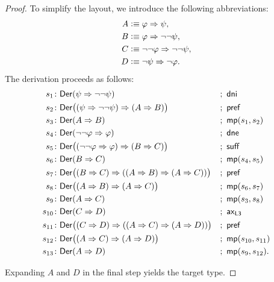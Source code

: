 \begin{proof}
    To simplify the layout, we introduce the following abbreviations:
    \begin{align*}
        A&\mathrel{\vcentcolon}\equiv\varphi\mathrel{\Rightarrow}\psi,\\
        B&\mathrel{\vcentcolon}\equiv\varphi\mathrel{\Rightarrow}\neg\neg\psi,\\
        C&\mathrel{\vcentcolon}\equiv\neg\neg\varphi\mathrel{\Rightarrow}\neg\neg\psi,\\
        D&\mathrel{\vcentcolon}\equiv\neg\psi\mathrel{\Rightarrow}\neg\varphi.
    \end{align*}
    The derivation proceeds as follows:
    {\small
    \begin{align*}
        s_1&\colon\fun{Der}(
            \psi\imp\neg\neg\psi
        )
            &&;\ \fun{dni}\\
        s_2&\colon\fun{Der}\bigl(
            (\psi\imp\neg\neg\psi)
            \imp
            (A\imp B)
        \bigr)
            &&;\ \fun{pref}\\
        s_3&\colon\fun{Der}(
            A\imp B
        )
            &&;\ \fun{mp}(s_1,s_2)\\
        s_4&\colon\fun{Der}(
            \neg\neg\varphi\imp\varphi
        )
            &&;\ \fun{dne}\\
        s_5&\colon\fun{Der}\bigl(
            (\neg\neg\varphi\imp\varphi)
            \imp
            (B\imp C)
        \bigr)
            &&;\ \fun{suff}\\
        s_6&\colon\fun{Der}(
            B\imp C
        )
            &&;\ \fun{mp}(s_4,s_5)\\
        s_7&\colon\fun{Der}\bigl(
            (B\imp C)
            \imp(
                (A\imp B)\imp(A\imp C)
            )
        \bigr)
            &&;\ \fun{pref}\\
        s_8&\colon\fun{Der}\bigl(
            (A\imp B)
            \imp
            (A\imp C)
        \bigr)
            &&;\ \fun{mp}(s_6,s_7)\\
        s_9&\colon\fun{Der}(
            A\imp C
        )
            &&;\ \fun{mp}(s_3,s_8)\\
        s_{10}&\colon\fun{Der}(
            C\imp D
        )
            &&;\ \fun{ax}_{\fun{L3}}\\
        s_{11}&\colon\fun{Der}\bigl(
            (C\imp D)
            \imp(
                (A\imp C)\imp(A\imp D)
            )
        \bigr)
            &&;\ \fun{pref}\\
        s_{12}&\colon\fun{Der}\bigl(
            (A\imp C)
            \imp
            (A\imp D)
        \bigr)
            &&;\ \fun{mp}(s_{10},s_{11})\\
        s_{13}&\colon\fun{Der}(
            A\imp D
        )
            &&;\ \fun{mp}(s_9,s_{12}).
    \end{align*}}
    
    Expanding $A$ and $D$ in the final step yields the target type.
\end{proof}

